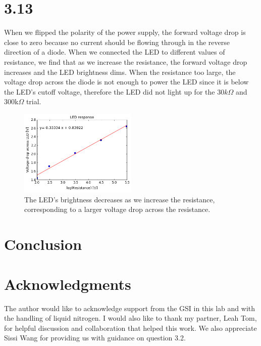 \documentclass[authoryear, 12pt,5p, times]{elsarticle}
\begin{document}
\section*{3.13}
When we flipped the polarity of the power supply, the forward voltage drop is close to zero because no current should be flowing through in the reverse direction of a diode. When we connected the LED to different values of resistance, we find that as we increase the resistance, the forward voltage drop increases and the LED brightness dims. When the resistance too large, the voltage drop across the diode is not enough to power the LED since it is below the LED's cutoff voltage, therefore the LED did not light up for the $30k\Omega$ and 300k$\Omega$ trial.
\begin{figure}[h!]
\center
\includegraphics[width=0.5\textwidth]{figure/3_13_LED}
\caption{The LED's brightness decreases as we increase the resistance, corresponding to a larger voltage drop across the resistance.}
\label{3_13_LED}
\end{figure}
\section{Conclusion}
\section*{Acknowledgments}
\begin{footnotesize}
The author would like to acknowledge support from the GSI in this lab and with the handling of liquid nitrogen. I would also like to thank my partner, Leah Tom, for helpful discussion and collaboration that helped this work. We also appreciate Sissi Wang for providing us with guidance on question 3.2.
\end{footnotesize}
\end{document}
